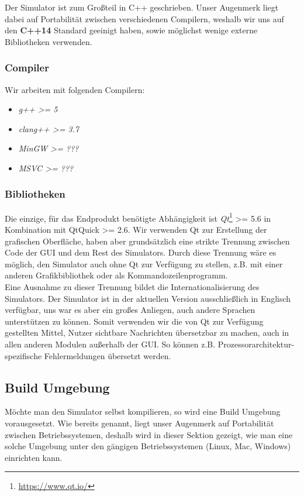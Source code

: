 Der Simulator ist zum Großteil in C++ geschrieben. Unser Augenmerk liegt dabei auf Portabilität
zwischen verschiedenen Compilern, weshalb wir uns auf den \textbf{C++14} Standard geeinigt haben,
sowie möglichst wenige externe Bibliotheken verwenden.

\subsubsection{Compiler}

Wir arbeiten mit folgenden Compilern:

\begin{itemize}
	\item \textit{g++ >= 5}
	\item \textit{clang++ >= 3.7}
	\item \textit{MinGW >= ???}
	\item \textit{MSVC >= ???}
\end{itemize}

\subsubsection{Bibliotheken}

Die einzige, für das Endprodukt benötigte Abhängigkeit ist \textit{Qt}\footnote{\url{https://www.qt.io/}}
>= 5.6 in Kombination mit QtQuick >= 2.6. Wir verwenden Qt zur Erstellung der grafischen Oberfläche,
haben aber grundsätzlich eine strikte Trennung zwischen Code der GUI und dem Rest des Simulators.
Durch diese Trennung wäre es möglich, den Simulator auch ohne Qt zur Verfügung zu stellen, z.B.
mit einer anderen Grafikbibliothek oder als Kommandozeilenprogramm. \\
Eine Ausnahme zu dieser Trennung bildet die Internationalisierung des Simulators. Der Simulator ist
in der aktuellen Version ausschließlich in Englisch verfügbar, uns war es aber ein großes Anliegen,
auch andere Sprachen unterstützen zu können. Somit verwenden wir die von Qt zur Verfügung gestellten
Mittel, Nutzer sichtbare Nachrichten übersetzbar zu machen, auch in allen anderen Modulen außerhalb
der GUI. So können z.B. Prozessorarchitektur-spezifische Fehlermeldungen übersetzt werden.


\subsection{Build Umgebung}

Möchte man den Simulator selbst kompilieren, so wird eine Build Umgebung vorausgesetzt. 
Wie bereits genannt, liegt unser Augenmerk auf Portabilität zwischen Betriebssystemen,
deshalb wird in dieser Sektion gezeigt, wie man eine solche Umgebung unter den gängigen
Betriebssystemen (Linux, Mac, Windows) einrichten kann.

